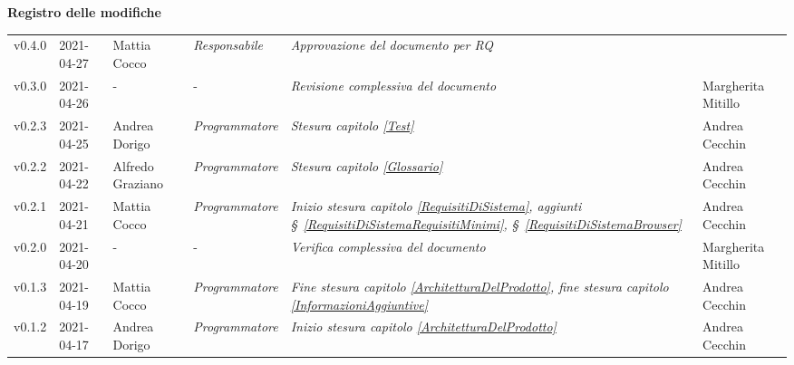 \quad
\begin{center}
	\LARGE\textbf{Registro delle modifiche}
\end{center}
\def\tabularxcolumn#1{m{#1}}
{

\begin{center}
	\renewcommand{\arraystretch}{1.4}
	\begin{longtable}[c]{|p{2cm-1\tabcolsep}|p{2cm}|p{3cm-2\tabcolsep}|p{3cm-1.5\tabcolsep}|p{}|p{4cm-2\tabcolsep}|}
		\hline
		\rowcolor{airforceblue}
		\makecell[c]{\textbf{Versione}} & \makecell[c]{\textbf{Data}} & \makecell[c]{\textbf{Autore}} & \makecell[c]{\textbf{Ruolo}} & \makecell[c]{\textbf{Modifica}} &  \makecell[c]{\textbf{Verificatore}}\\
		\hline
		\centering v0.4.0 & 2021-04-27 & Mattia Cocco & \centering \textit{Responsabile} & \textit{Approvazione del documento per RQ}  & \makecell[c]{-}\\
		\hline
		\hline
		\centering v0.3.0 & 2021-04-26 &\centering - &\centering - & \textit{Revisione complessiva del documento} & Margherita Mitillo\\
		\hline
		\hline
		\centering v0.2.3 & 2021-04-25 & Andrea Dorigo & \centering \textit{Programmatore} & \textit{Stesura capitolo \ref{Test}} & Andrea Cecchin\\
		\hline
		\hline
		\centering v0.2.2 & 2021-04-22 & Alfredo Graziano & \centering \textit{Programmatore} & \textit{Stesura capitolo \ref{Glossario}} & Andrea Cecchin\\
		\hline
		\hline
		\centering v0.2.1 & 2021-04-21 & Mattia Cocco & \centering \textit{Programmatore} & \textit{Inizio stesura capitolo \ref{RequisitiDiSistema}, aggiunti \S~\ref{RequisitiDiSistemaRequisitiMinimi}, \S~\ref{RequisitiDiSistemaBrowser}} & Andrea Cecchin\\
		\hline
		\hline
		\centering v0.2.0 & 2021-04-20 & \centering- & \centering- & \textit{Verifica complessiva del documento} & Margherita Mitillo \\
		\hline
		\hline
		\centering v0.1.3 & 2021-04-19 & Mattia Cocco & \centering \textit{Programmatore} & \textit{Fine stesura capitolo \ref{ArchitetturaDelProdotto}, fine stesura capitolo \ref{InformazioniAggiuntive}} & Andrea Cecchin\\
		\hline
		\hline
		\centering v0.1.2 & 2021-04-17 & Andrea Dorigo & \centering \textit{Programmatore} & \textit{Inizio stesura capitolo \ref{ArchitetturaDelProdotto}} & Andrea Cecchin\\

\end{longtable}
\end{center}}
